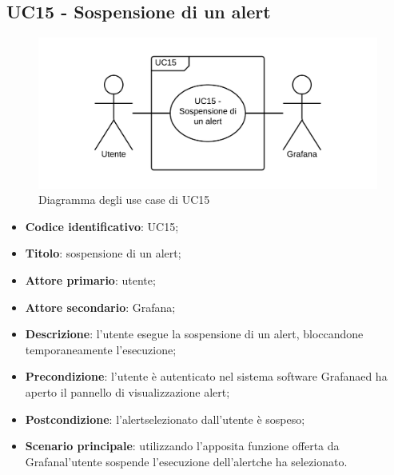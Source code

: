 \subsection{UC15 - Sospensione di un alert}
\begin{figure}[H]
\includegraphics{img/UC15_-_Sospensione_di_un_alert.png}
\caption{Diagramma degli use case di UC15}
\end{figure}
\begin{itemize}
	\item \textbf{Codice identificativo}: UC15;
	\item \textbf{Titolo}: sospensione di un alert\glo;
	\item \textbf{Attore primario}: utente;
	\item \textbf{Attore secondario}: Grafana\glo;
	\item \textbf{Descrizione}: l'utente esegue la sospensione di un alert\glosp, bloccandone temporaneamente l'esecuzione;
	\item \textbf{Precondizione}: l'utente è autenticato nel sistema software Grafana\glosp ed ha aperto il pannello di visualizzazione alert\glo;
	\item \textbf{Postcondizione}: l'alert\glosp selezionato dall'utente è sospeso;
	\item \textbf{Scenario principale}: utilizzando l'apposita funzione offerta da Grafana\glosp l'utente sospende l'esecuzione dell'alert\glosp che ha selezionato.
\end{itemize} 
